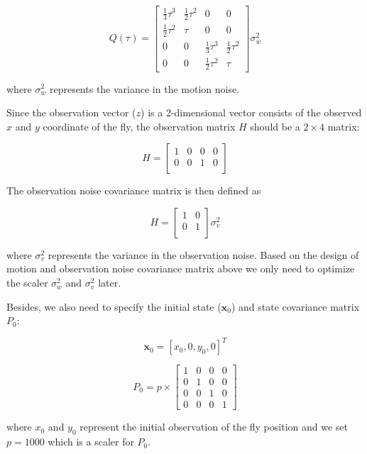 \begin{equation*}
    Q(\tau) = 
    \left[ 
        \begin{array}{cccc}
          \frac{1}{3} \tau^3 & \frac{1}{2} \tau^2 & 0 & 0 \\
          \frac{1}{2} \tau^2 & \tau & 0 & 0 \\
          0 & 0 & \frac{1}{3} \tau^3 & \frac{1}{2} \tau^2 \\
          0 & 0 & \frac{1}{2} \tau^2 & \tau
        \end{array} 
    \right]
      \sigma^2_w
\end{equation*}

where $\sigma^2_w$ represents the variance in the motion noise.

Since the observation vector ($z$) is a 2-dimensional vector consists of the observed $x$ and $y$ coordinate of the fly, the observation matrix $H$ should be a $2 \times 4$ matrix:

\begin{equation*}
    H = 
    \left[ 
        \begin{array}{cccc}
            1 & 0 & 0 & 0 \\
            0 & 0 & 1 & 0 \\
        \end{array} 
    \right]
\end{equation*}

The observation noise covariance matrix is then defined as 

\begin{equation*}
    H = 
    \left[ 
        \begin{array}{cc}
          1 & 0 \\
          0 & 1 \\
        \end{array} 
    \right]
    \sigma^2_v
\end{equation*}

where $\sigma^2_v$ represents the variance in the observation noise.
Based on the design of motion and observation noise covariance matrix above we only need to optimize the scaler $\sigma^2_w$ and $\sigma^2_v$ later.

Besides, we also need to specify the initial state ($\mathbf{x}_0$) and state covariance matrix $P_0$:

\begin{equation*}
    \mathbf{x}_0 = [x_0, 0, y_0, 0]^T
\end{equation*}

\begin{equation*}
    P_0 = p \times 
    \left[ 
        \begin{array}{cccc}
          1 & 0 & 0 & 0 \\
          0 & 1 & 0 & 0 \\
          0 & 0 & 1 & 0 \\
          0 & 0 & 0 & 1
        \end{array} 
    \right]
\end{equation*}

where $x_0$ and $y_0$ represent the initial observation of the fly position and we set $p=1000$ which is a scaler for $P_0$.